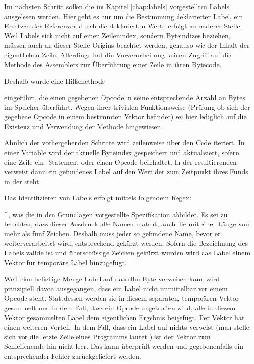Im nächsten Schritt sollen die im Kapitel \ref{chap:labels} vorgestellten Labels ausgelesen werden. Hier geht es nur um die Bestimmung deklarierter Label, ein Ersetzen der Referenzen durch die deklarierten Werte erfolgt an anderer Stelle. Weil Labels sich nicht auf einen Zeilenindex, sondern Byteindizes beziehen, müssen auch an dieser Stelle Origins beachtet werden, genauso wie der Inhalt der eigentlichen Zeile. Allerdings hat die Vorverarbeitung keinen Zugriff auf die Methode  des Assemblers zur Überführung einer Zeile in ihren Bytecode. 

Deshalb wurde eine Hilfsmethode

 eingeführt, die einen gegebenen Opcode in seine entsprechende Anzahl an Bytes im Speicher überführt. Wegen ihrer trivialen Funktionsweise (Prüfung ob sich der gegebene Opcode in einem bestimmten Vektor befindet) sei hier lediglich auf die Existenz und Verwendung der Methode hingewiesen. 

Ähnlich der vorhergehenden Schritte wird zeilenweise über den Code iteriert. In einer Variable  wird der aktuelle Byteindex gespeichert und aktualisiert, sofern eine Zeile ein -Statement oder einen Opcode beinhaltet. In der resultierenden  verweist dann ein gefundenes Label auf den Wert der zum Zeitpunkt ihres Funds in der  steht.

Das Identifizieren von Labels erfolgt mittels folgendem Regex:

\textasciicircum\regex{( *[a-zA-Z@?][a-zA-Z@?0-9]*:)}, was die in den Grundlagen vorgestellte Spezifikation abbildet. Es sei zu beachten, dass dieser Ausdruck alle Namen matcht, auch die mit einer Länge von mehr als fünf Zeichen. Deshalb muss jeder so gefundene Name, bevor er weiterverarbeitet wird, entsprechend gekürzt werden. Sofern die Bezeichnung des Labels valide ist und überschüssige Zeichen gekürzt wurden wird das Label einem Vektor für \glqq temporäre\grqq{} Label hinzugefügt.

Weil eine beliebige Menge Label auf dasselbe Byte verweisen kann wird prinzipiell davon ausgegangen, dass ein Label nicht unmittelbar vor einem Opcode steht. Stattdessen werden sie in diesem separaten, \glqq temporären\grqq{} Vektor gesammelt und in dem Fall, dass ein Opcode angetroffen wird, alle in diesem Vektor gesammelten Label dem eigentlichen Ergebnis beigefügt. Der Vektor hat einen weiteren Vorteil: In dem Fall, dass ein Label auf nichts verweist (man stelle sich vor die letzte Zeile eines Programms lautet ) ist der Vektor zum Schleifenende hin nicht leer. Das kann überprüft werden und gegebenenfalls ein entsprechender Fehler zurückgeliefert werden.

